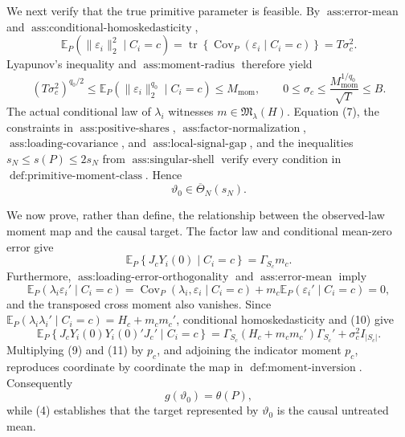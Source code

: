 We next verify that the true primitive parameter is feasible.  By \(\operatorname{ass:error\text{-}mean}\) and \(\operatorname{ass:conditional\text{-}homoskedasticity}\),
\[
 \mathbb E_P\!\left(\|\varepsilon_i\|_2^2\mid C_i=c\right)
 =\operatorname{tr}\!\left\{\operatorname{Cov}_P(\varepsilon_i\mid C_i=c)\right\}
 =T\sigma_c^2.
\]
Lyapunov's inequality and \(\operatorname{ass:moment\text{-}radius}\) therefore yield
\[
 (T\sigma_c^2)^{q_0/2}
 \leq\mathbb E_P\!\left(\|\varepsilon_i\|_2^{q_0}\mid C_i=c\right)
 \leq M_{\mathrm{mom}},
 \qquad
 0\leq\sigma_c\leq \frac{M_{\mathrm{mom}}^{1/q_0}}{\sqrt T}\leq B.
 \tag{7}
\]
The actual conditional law of \(\lambda_i\) witnesses \(m\in\mathfrak M_\lambda(H)\).  Equation (7), the constraints in \(\operatorname{ass:positive\text{-}shares}\), \(\operatorname{ass:factor\text{-}normalization}\), \(\operatorname{ass:loading\text{-}covariance}\), and \(\operatorname{ass:local\text{-}signal\text{-}gap}\), and the inequalities \(s_N\leq s(P)\leq2s_N\) from \(\operatorname{ass:singular\text{-}shell}\) verify every condition in \(\operatorname{def:primitive\text{-}moment\text{-}class}\).  Hence
\[
 \vartheta_0\in\overline\Theta_N(s_N).
 \tag{8}
\]

We now prove, rather than define, the relationship between the observed-law moment map and the causal target.  The factor law and conditional mean-zero error give
\[
 \mathbb E_P\!\left\{J_cY_i(0)\mid C_i=c\right\}=\Gamma_{S_c}m_c.
 \tag{9}
\]
Furthermore, \(\operatorname{ass:loading\text{-}error\text{-}orthogonality}\) and \(\operatorname{ass:error\text{-}mean}\) imply
\[
 \mathbb E_P\!\left(\lambda_i\varepsilon_i'\mid C_i=c\right)
 =\operatorname{Cov}_P(\lambda_i,\varepsilon_i\mid C_i=c)
 +m_c\mathbb E_P\!\left(\varepsilon_i'\mid C_i=c\right)
 =0,
 \tag{10}
\]
and the transposed cross moment also vanishes.  Since
\(\mathbb E_P(\lambda_i\lambda_i'\mid C_i=c)=H_c+m_cm_c'\), conditional homoskedasticity and (10) give
\[
 \mathbb E_P\!\left\{J_cY_i(0)Y_i(0)'J_c'\mid C_i=c\right\}
 =\Gamma_{S_c}(H_c+m_cm_c')\Gamma_{S_c}'
 +\sigma_c^2I_{|S_c|}.
 \tag{11}
\]
Multiplying (9) and (11) by \(p_c\), and adjoining the indicator moment \(p_c\), reproduces coordinate by coordinate the map in \(\operatorname{def:moment\text{-}inversion}\).  Consequently
\[
 g(\vartheta_0)=\theta(P),
 \tag{12}
\]
while (4) establishes that the target represented by \(\vartheta_0\) is the causal untreated mean.

